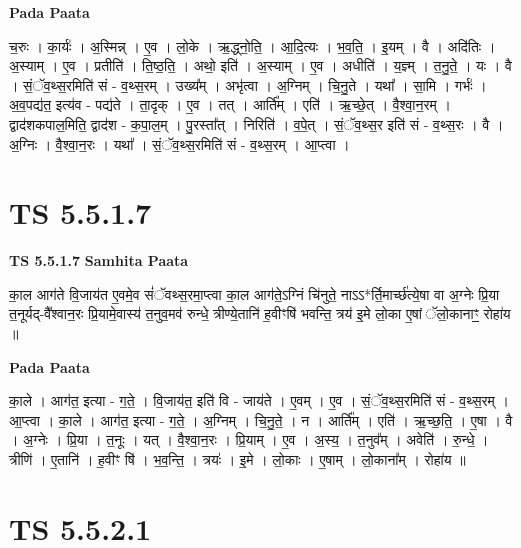 \documentclass[17pt]{extarticle}
\begin{document}
\textbf{Pada Paata} \newline

च॒रुः । का॒र्यः॑ । अ॒स्मिन्न् । ए॒व । लो॒के । ऋ॒द्ध्नो॒ति॒ । आ॒दि॒त्यः । भ॒व॒ति॒ । इ॒यम् । वै । अदि॑तिः । अ॒स्याम् । ए॒व । प्रतीति॑ । ति॒ष्ठ॒ति॒ । अथो॒ इति॑ । अ॒स्याम् । ए॒व । अधीति॑ । य॒ज्ञ्म् । त॒नु॒ते॒ । यः । वै । सं॒ॅव॒थ्स॒रमिति॑ सं - व॒थ्स॒रम् । उख्य᳚म् । अभृ॑त्वा । अ॒ग्निम् । चि॒नु॒ते । यथा᳚ । सा॒मि । गर्भः॑ । अ॒व॒पद्य॑त॒ इत्य॑व - पद्य॑ते । ता॒दृक् । ए॒व । तत् । आर्ति᳚म् । एति॑ । ऋ॒च्छे॒त् । वै॒श्वा॒न॒रम् । द्वाद॑शकपाल॒मिति॒ द्वाद॑श - क॒पा॒ल॒म् । पु॒रस्ता᳚त् । निरिति॑ । व॒पे॒त् । सं॒ॅव॒थ्स॒र इति॑ सं - व॒थ्स॒रः । वै । अ॒ग्निः । वै॒श्वा॒न॒रः । यथा᳚ । सं॒ॅव॒थ्स॒रमिति॑ सं - व॒थ्स॒रम् । आ॒प्त्वा ।  \newline




\section*{ TS 5.5.1.7 }

\textbf{TS 5.5.1.7 } \newline
\textbf{Samhita Paata} \newline

का॒ल आग॑ते वि॒जाय॑त ए॒वमे॒व सं॑ॅवथ्स॒रमा॒प्त्वा का॒ल आग॑ते॒ऽग्निं चि॑नुते॒ नाऽऽ*र्ति॒मार्च्छ॑त्ये॒षा वा अ॒ग्नेः प्रि॒या त॒नूर्यद्-वै᳚श्वान॒रः प्रि॒यामे॒वास्य॑ त॒नुव॒मव॑ रुन्धे॒ त्रीण्ये॒तानि॑ ह॒वीꣳषि॑ भवन्ति॒ त्रय॑ इ॒मे लो॒का ए॒षां ॅलो॒कानाꣳ॒॒ रोहा॑य ॥ \newline

\textbf{Pada Paata} \newline

का॒ले । आग॑त॒ इत्या - ग॒ते॒ । वि॒जाय॑त॒ इति॑ वि - जाय॑ते । ए॒वम् । ए॒व । सं॒ॅव॒थ्स॒रमिति॑ सं - व॒थ्स॒रम् । आ॒प्त्वा । का॒ले । आग॑त॒ इत्या - ग॒ते॒ । अ॒ग्निम् । चि॒नु॒ते॒ । न । आर्ति᳚म् । एति॑ । ऋ॒च्छ॒ति॒ । ए॒षा । वै । अ॒ग्नेः । प्रि॒या । त॒नूः । यत् । वै॒श्वा॒न॒रः । प्रि॒याम् । ए॒व । अ॒स्य॒ । त॒नुव᳚म् । अवेति॑ । रु॒न्धे॒ । त्रीणि॑ । ए॒तानि॑ । ह॒वीꣳ षि॑ । भ॒व॒न्ति॒ । त्रयः॑ । इ॒मे । लो॒काः । ए॒षाम् । लो॒काना᳚म् । रोहा॑य ॥  \newline




\section*{ TS 5.5.2.1 }
\end{document}
